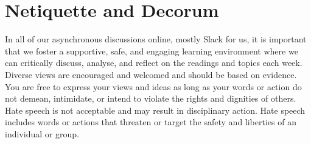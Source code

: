 \documentclass{article}
\begin{document}
 \section{Netiquette and Decorum}
 In all of our asynchronous discussions online, mostly Slack for us,  it is important that we foster a supportive, safe, 
 and engaging learning environment where we can critically discuss, analyse, and reflect on the 
 readings and topics each week. Diverse views are encouraged and welcomed and should be based on evidence. 
 You are free to express your views and ideas as long as your words or action do not demean, intimidate, or intend
  to violate the rights and dignities of others. Hate speech is not acceptable and may result in disciplinary action. 
 Hate speech includes words or actions that threaten or target the safety and liberties of an individual or group.
   
\end{document}
